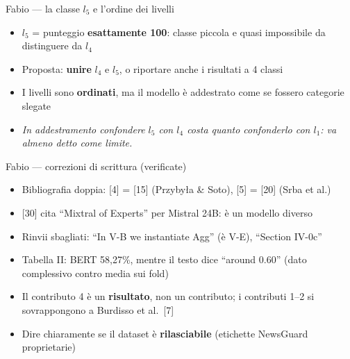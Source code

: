 \documentclass[aspectratio=169]{beamer}
\newcommand{\hl}[1]{\textbf{#1}}
\begin{document}
\begin{frame}{Fabio --- la classe $l_5$ e l'ordine dei livelli}
  \vfill
  \begin{itemize}[<+->]
    \setlength\itemsep{0.8em}
    \item $l_5$ = punteggio \hl{esattamente 100}: classe piccola e quasi impossibile da distinguere da $l_4$
    \item Proposta: \hl{unire} $l_4$ e $l_5$, o riportare anche i risultati a 4 classi
    \item I livelli sono \hl{ordinati}, ma il modello \`e addestrato come se fossero categorie slegate
    \item[] {\small\itshape In addestramento confondere $l_5$ con $l_4$ costa quanto confonderlo con $l_1$: va almeno detto come limite.}
  \end{itemize}
  \vfill
\end{frame}

\begin{frame}{Fabio --- correzioni di scrittura (verificate)}
  \vfill
  \small
  \begin{itemize}[<+->]
    \setlength\itemsep{0.55em}
    \item Bibliografia doppia: [4] = [15] (Przyby\l{}a \& Soto), [5] = [20] (Srba et al.)
    \item {[30]} cita ``Mixtral of Experts'' per Mistral 24B: \`e un modello diverso
    \item Rinvii sbagliati: ``In V-B we instantiate Agg'' (\`e V-E), ``Section IV-0c''
    \item Tabella II: BERT 58,27\%, mentre il testo dice ``around 0.60'' (dato complessivo contro media sui fold)
    \item Il contributo 4 \`e un \hl{risultato}, non un contributo; i contributi 1--2 si sovrappongono a Burdisso et al.\ [7]
    \item Dire chiaramente se il dataset \`e \hl{rilasciabile} (etichette NewsGuard proprietarie)
  \end{itemize}
  \vfill
\end{frame}

\end{document}
